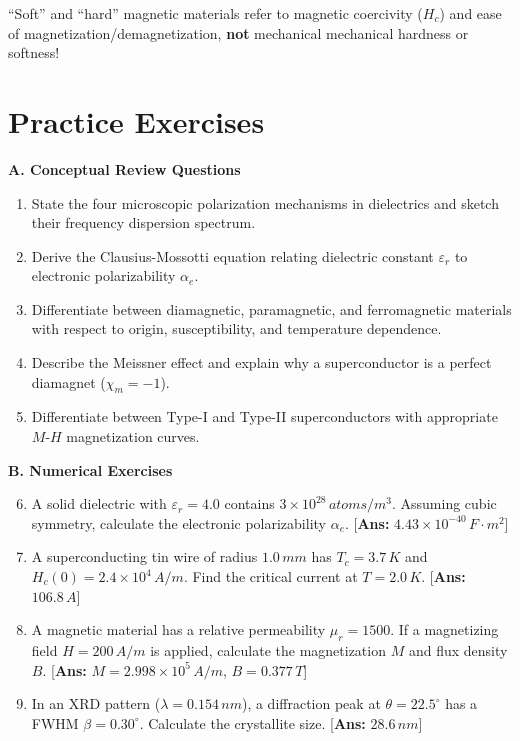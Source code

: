 \begin{commonmistake}
``Soft'' and ``hard'' magnetic materials refer to magnetic coercivity ($H_c$) and ease of magnetization/demagnetization, \textbf{not} mechanical mechanical hardness or softness!
\end{commonmistake}

\section{Practice Exercises}

\begin{practiceset}
\textbf{A. Conceptual Review Questions}
\begin{enumerate}
    \item State the four microscopic polarization mechanisms in dielectrics and sketch their frequency dispersion spectrum.
    \item Derive the Clausius-Mossotti equation relating dielectric constant $\varepsilon_r$ to electronic polarizability $\alpha_e$.
    \item Differentiate between diamagnetic, paramagnetic, and ferromagnetic materials with respect to origin, susceptibility, and temperature dependence.
    \item Describe the Meissner effect and explain why a superconductor is a perfect diamagnet ($\chi_m = -1$).
    \item Differentiate between Type-I and Type-II superconductors with appropriate $M$-$H$ magnetization curves.
\end{enumerate}

\textbf{B. Numerical Exercises}
\begin{enumerate}
    \setcounter{enumi}{5}
    \item A solid dielectric with $\varepsilon_r = 4.0$ contains $3 \times 10^{28}\,\si{atoms/m^3}$. Assuming cubic symmetry, calculate the electronic polarizability $\alpha_e$. \hfill [\textbf{Ans:} $4.43 \times 10^{-40}\,\si{F\cdot m^2}$]
    \item A superconducting tin wire of radius $1.0\,\si{mm}$ has $T_c = 3.7\,\si{K}$ and $H_c(0) = 2.4 \times 10^4\,\si{A/m}$. Find the critical current at $T = 2.0\,\si{K}$. \hfill [\textbf{Ans:} $106.8\,\si{A}$]
    \item A magnetic material has a relative permeability $\mu_r = 1500$. If a magnetizing field $H = 200\,\si{A/m}$ is applied, calculate the magnetization $M$ and flux density $B$. \hfill [\textbf{Ans:} $M = 2.998 \times 10^5\,\si{A/m}$, $B = 0.377\,\si{T}$]
    \item In an XRD pattern ($\lambda = 0.154\,\si{nm}$), a diffraction peak at $\theta = 22.5^\circ$ has a FWHM $\beta = 0.30^\circ$. Calculate the crystallite size. \hfill [\textbf{Ans:} $28.6\,\si{nm}$]
\end{enumerate}
\end{practiceset}

